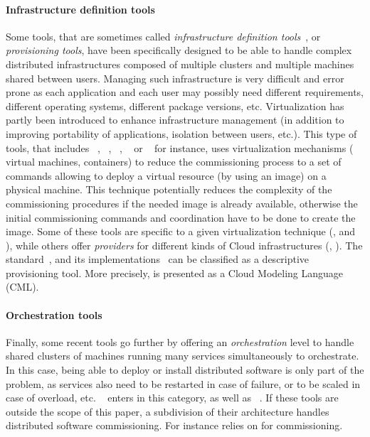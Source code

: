 \paragraph{Infrastructure definition tools}
Some tools, that are sometimes called \emph{infrastructure definition
  tools}~\cite{}, or \emph{provisioning tools}, have been specifically
designed to be able to handle complex distributed infrastructures
composed of multiple clusters and multiple machines shared between
users. Managing such infrastructure is very difficult and error prone
as each application and each user may possibly need different
requirements, different operating systems, different package versions,
etc. Virtualization has partly been introduced to enhance
infrastructure management (in addition to improving portability of
applications, isolation between users, etc.). This type of tools, that
includes \docker~\cite{docker:web}, \terraform~\cite{terraform:web},
\juju~\cite{juju:web}, \cloudformation~\cite{cloudf:web} or
\heat~\cite{heat:web} for instance, uses virtualization mechanisms (\eg
virtual machines, containers) to reduce the commissioning process to a
set of commands allowing to deploy a virtual resource (by using an image) on a
physical machine. This technique potentially reduces the complexity of
the commissioning procedures if the needed image is already available,
otherwise the initial commissioning commands and coordination have to
be done to create the image. Some of these tools are specific to a
given virtualization technique (\eg \docker, \cloudformation and
\heat), while others offer \emph{providers} for different kinds of
Cloud infrastructures (\eg \terraform, \juju). The \tosca
standard~\cite{tosca:web}, and its
implementations~\cite{Binz2013,cloudify:web,opentosca:web,8599581} can
be classified as a descriptive provisioning tool. More precisely,
\tosca is presented as a Cloud Modeling Language (CML).

\paragraph{Orchestration tools}
Finally, some recent tools go further by offering an
\emph{orchestration} level to handle shared clusters of machines
running many services simultaneously to orchestrate. In this case,
being able to deploy or install distributed software is only part of
the problem, as services also need to be restarted in case of failure, or
to be scaled in case of overload, etc.
\kubernetes~\cite{kubernetes:web} enters in this category, as well as
\dockerswarm~\cite{dockerswarm:web}. If these tools are outside the
scope of this paper, a subdivision of their architecture handles
distributed software commissioning. For instance \kubernetes relies
on \docker for commissioning.

